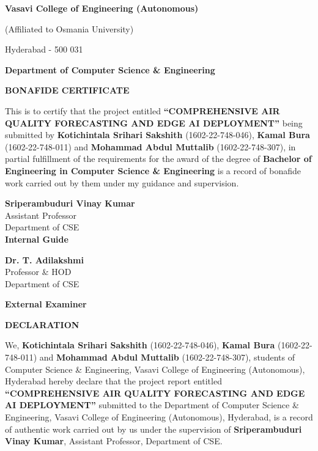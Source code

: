 \documentclass[12pt,a4paper]{report}
\newcommand{\projecttitle}{COMPREHENSIVE AIR QUALITY FORECASTING AND EDGE AI DEPLOYMENT}
\newcommand{\studentA}{Kotichintala Srihari Sakshith}
\newcommand{\htnoA}{1602-22-748-046}
\newcommand{\studentB}{Kamal Bura}
\newcommand{\htnoB}{1602-22-748-011}
\newcommand{\studentC}{Mohammad Abdul Muttalib}
\newcommand{\htnoC}{1602-22-748-307}
\newcommand{\guide}{Sriperambuduri Vinay Kumar}
\newcommand{\designation}{Assistant Professor}
\newcommand{\hod}{Dr. T. Adilakshmi}
\newcommand{\dept}{Department of Computer Science \& Engineering}
\newcommand{\college}{Vasavi College of Engineering (Autonomous)}
\newcommand{\affiliation}{(Affiliated to Osmania University)}
\begin{document}
\newpage\thispagestyle{empty}\singlespacing
\begin{center}
    {\Large \textbf{\college} \par}
    \vspace{0.08in}
    {\large \affiliation \par}
    \vspace{0.08in}
    {\large Hyderabad - 500 031 \par}
    \vspace{0.2in}
    {\Large \textbf{\dept} \par}
    \vspace{0.3in}
    {\Large \textbf{BONAFIDE CERTIFICATE} \par}
\end{center}
\vspace{0.3in}
\hspace{0.5in} This is to certify that the project entitled \textbf{``\projecttitle''} being submitted by \textbf{\studentA} (\htnoA), \textbf{\studentB} (\htnoB) and \textbf{\studentC} (\htnoC), in partial fulfillment of the requirements for the award of the degree of \textbf{Bachelor of Engineering in Computer Science \& Engineering} is a record of bonafide work carried out by them under my guidance and supervision.

\vspace{0.4in}
\begin{flushright}
    \textbf{\guide} \\
    \designation \\
    Department of CSE \\
    \vspace{0.1in}
    \textbf{Internal Guide}
\end{flushright}

\vspace{0.4in}
\begin{flushleft}
    \textbf{\hod} \\
    Professor \& HOD \\
    Department of CSE
\end{flushleft}

\vspace{0.4in}
\begin{center}\textbf{External Examiner}\end{center}

\newpage\thispagestyle{empty}\singlespacing
\begin{center}
    {\Large \textbf{DECLARATION} \par}
\end{center}
\vspace{0.3in}
We, \textbf{\studentA} (\htnoA), \textbf{\studentB} (\htnoB) and \textbf{\studentC} (\htnoC), students of Computer Science \& Engineering, \college, Hyderabad hereby declare that the project report entitled \textbf{``\projecttitle''} submitted to the Department of Computer Science \& Engineering, \college, Hyderabad, is a record of authentic work carried out by us under the supervision of \textbf{\guide}, \designation, Department of CSE.
\end{document}
